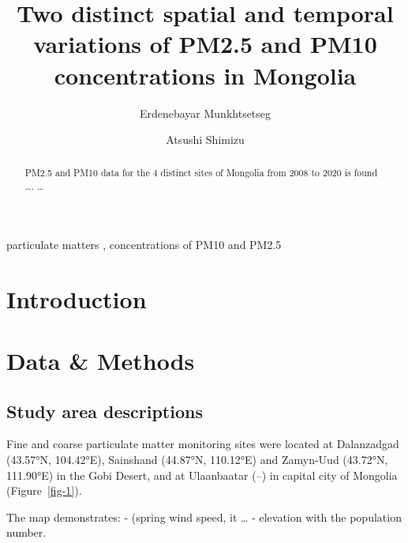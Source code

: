 \documentclass[
  number]{elsarticle}
\begin{document}
\begin{frontmatter}
\title{Two distinct spatial and temporal variations of PM2.5 and PM10
concentrations in Mongolia}
\author[1,2]{Erdenebayar Munkhtsetseg%
%
}
\author[3]{Atsushi Shimizu%
%
}




        
\begin{abstract}
PM2.5 and PM10 data for the 4 distinct sites of Mongolia from 2008 to
2020 is found \ldots. \ldots{}
\end{abstract}





\begin{keyword}
    particulate matters \sep 
    concentrations of PM10 and PM2.5
\end{keyword}
\end{frontmatter}
    
\section{Introduction}\label{introduction}

\section{Data \& Methods}\label{sec-data-methods}

\subsection{Study area descriptions}\label{study-area-descriptions}

Fine and coarse particulate matter monitoring sites were located at
Dalanzadgad (43.57°N, 104.42°E), Sainshand (44.87°N, 110.12°E) and
Zamyn-Uud (43.72°N, 111.90°E) in the Gobi Desert, and at Ulaanbaatar
(--) in capital city of Mongolia (Figure~\ref{fig-1}).

The map demonstrates: - (spring wind speed, it \ldots{} - elevation with
the population number.
\end{document}
